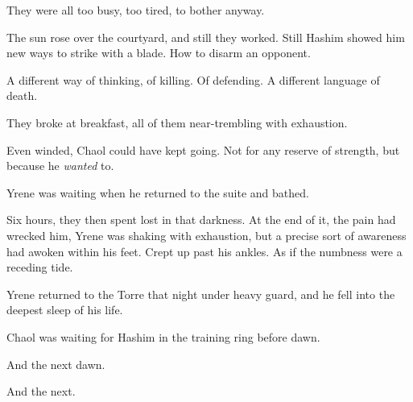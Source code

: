 They were all too busy, too tired, to bother anyway.

The sun rose over the courtyard, and still they worked.
Still Hashim showed him new ways to strike with a blade.
How to disarm an opponent.

A different way of thinking, of killing.
Of defending.
A different language of death.

They broke at breakfast, all of them near-trembling with exhaustion.

Even winded, Chaol could have kept going.
Not for any reserve of strength, but because he \emph{wanted} to.

Yrene was waiting when he returned to the suite and bathed.

Six hours, they then spent lost in that darkness.
At the end of it, the pain had wrecked him, Yrene was shaking with exhaustion, but a precise sort of awareness had awoken within his feet.
Crept up past his ankles.
As if the numbness were a receding tide.

Yrene returned to the Torre that night under heavy guard, and he fell into the deepest sleep of his life.

Chaol was waiting for Hashim in the training ring before dawn.

And the next dawn.

And the next.

